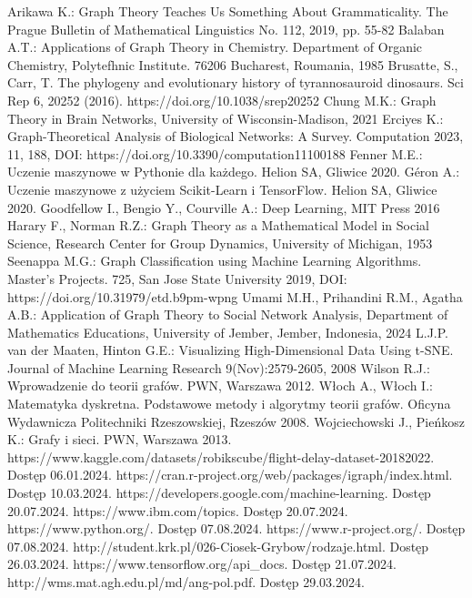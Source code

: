 
\begin{thebibliography}{4}
     Arikawa K.: Graph Theory Teaches Us Something About Grammaticality. The Prague Bulletin of Mathematical Linguistics No. 112, 2019, pp. 55-82
     Balaban A.T.: Applications of Graph Theory in Chemistry. Department of Organic Chemistry, Polytefhnic Institute. 76206 Bucharest, Roumania, 1985
     Brusatte, S., Carr, T. The phylogeny and evolutionary history of tyrannosauroid dinosaurs. Sci Rep 6, 20252 (2016). https://doi.org/10.1038/srep20252
     Chung M.K.: Graph Theory in Brain Networks, University of Wisconsin-Madison, 2021 
     Erciyes K.: Graph-Theoretical Analysis of Biological Networks: A Survey. Computation 2023, 11, 188, DOI: https://doi.org/10.3390/computation11100188
     Fenner M.E.: Uczenie maszynowe w Pythonie dla każdego. Helion SA, Gliwice 2020.
     Géron A.: Uczenie maszynowe z użyciem Scikit-Learn i TensorFlow. Helion SA, Gliwice 2020.
     Goodfellow I., Bengio Y., Courville A.: Deep Learning, MIT Press 2016
     Harary F., Norman R.Z.: Graph Theory as a Mathematical Model in Social Science, Research Center for Group Dynamics, University of Michigan, 1953
     Seenappa M.G.: Graph Classification using Machine Learning Algorithms. Master's Projects. 725, San Jose State University 2019, DOI: https://doi.org/10.31979/etd.b9pm-wpng
     Umami M.H., Prihandini R.M., Agatha A.B.: Application of Graph Theory to Social Network Analysis, Department of Mathematics Educations, University of Jember, Jember, Indonesia, 2024
     L.J.P. van der Maaten, Hinton G.E.: Visualizing High-Dimensional Data Using t-SNE. Journal of Machine Learning Research 9(Nov):2579-2605, 2008
     Wilson R.J.: Wprowadzenie do teorii grafów. PWN, Warszawa 2012.
     Włoch A., Włoch I.: Matematyka dyskretna. Podstawowe metody i algorytmy teorii grafów. Oficyna Wydawnicza Politechniki Rzeszowskiej, Rzeszów 2008.
     Wojciechowski J., Pieńkosz K.: Grafy i sieci. PWN, Warszawa 2013.
     https://www.kaggle.com/datasets/robikscube/flight-delay-dataset-20182022. Dostęp 06.01.2024.
     https://cran.r-project.org/web/packages/igraph/index.html. Dostęp 10.03.2024.
     https://developers.google.com/machine-learning. Dostęp 20.07.2024.
     https://www.ibm.com/topics. Dostęp 20.07.2024.
     https://www.python.org/. Dostęp 07.08.2024.
     https://www.r-project.org/. Dostęp 07.08.2024.
     http://student.krk.pl/026-Ciosek-Grybow/rodzaje.html. Dostęp 26.03.2024.
     https://www.tensorflow.org/api\_docs. Dostęp 21.07.2024.
     http://wms.mat.agh.edu.pl/\texttildelow md/ang-pol.pdf. Dostęp 29.03.2024.
\end{thebibliography}